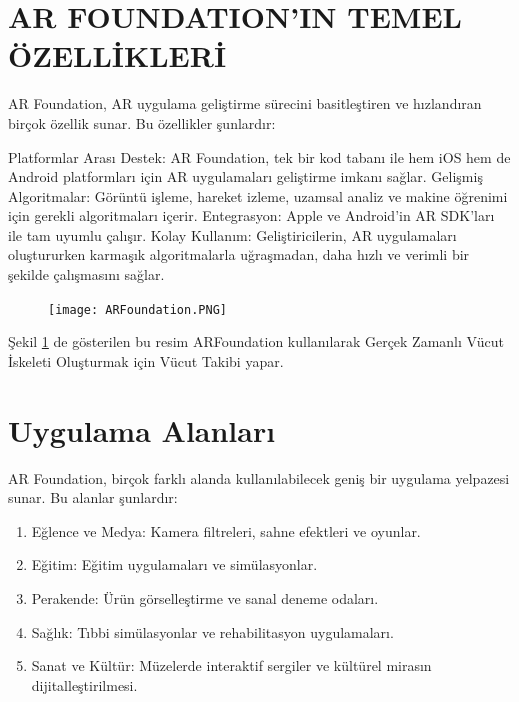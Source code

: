 \documentclass[12pt, a4paper]{article}
\begin{document}
	\section{AR FOUNDATION'IN TEMEL ÖZELLİKLERİ }
    AR Foundation, AR uygulama geliştirme sürecini basitleştiren ve hızlandıran birçok özellik sunar. Bu özellikler şunlardır:
    
    Platformlar Arası Destek: AR Foundation, tek bir kod tabanı ile hem iOS hem de Android platformları için AR uygulamaları geliştirme imkanı sağlar.
    Gelişmiş Algoritmalar: Görüntü işleme, hareket izleme, uzamsal analiz ve makine öğrenimi için gerekli algoritmaları içerir.
    Entegrasyon: Apple ve Android'in AR SDK'ları ile tam uyumlu çalışır.
    Kolay Kullanım: Geliştiricilerin, AR uygulamaları oluştururken karmaşık algoritmalarla uğraşmadan, daha hızlı ve verimli bir şekilde çalışmasını sağlar.
	\newpage
	\begin{figure}[!ht]
		\caption{}
		\centering
		\texttt{[image: ARFoundation.PNG]}
		
		\label{ARFoundation}
	\end{figure}
	Şekil \ref{ARFoundation} de gösterilen bu resim ARFoundation kullanılarak Gerçek Zamanlı Vücut İskeleti Oluşturmak için Vücut Takibi yapar\cite{Youtube}.
	
	
	
	
	
	\newpage
	\section{Uygulama Alanları}
		
		AR Foundation, birçok farklı alanda kullanılabilecek geniş bir uygulama yelpazesi sunar. Bu alanlar şunlardır:
		\begin{enumerate}
		\item Eğlence ve Medya: Kamera filtreleri, sahne efektleri ve oyunlar.
		\item Eğitim: Eğitim uygulamaları ve simülasyonlar.
		\item Perakende: Ürün görselleştirme ve sanal deneme odaları.
		\item Sağlık: Tıbbi simülasyonlar ve rehabilitasyon uygulamaları.
		\item Sanat ve Kültür: Müzelerde interaktif sergiler ve kültürel mirasın dijitalleştirilmesi.
	\end{enumerate}
\end{document}
